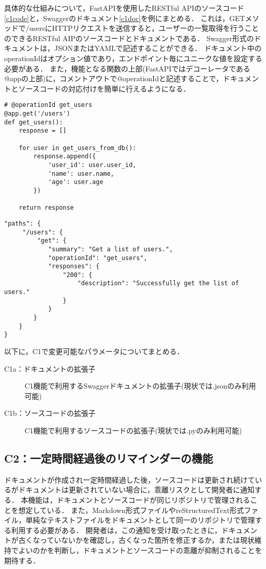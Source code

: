 具体的な仕組みについて，FastAPIを使用したRESTful APIのソースコード\ref{c1code}と，Swaggerのドキュメント\ref{c1doc}を例にまとめる．
これは，GETメソッドで/usersにHTTPリクエストを送信すると，ユーザーの一覧取得を行うことのできるRESTful AIPのソースコードとドキュメントである．
Swagger形式のドキュメントは，JSONまたはYAMLで記述することができる．
ドキュメント中のoperationIdはオプション値であり，エンドポイント毎にユニークな値を設定する必要がある．
また，機能となる関数の上部(FastAPIではデコーレータである@appの上部)に，コメントアウトで@operationIdと記述することで，ドキュメントとソースコードの対応付けを簡単に行えるようになる．

\begin{lstlisting}[caption=RESTful API, label=c1code]
# @operationId get_users
@app.get('/users')
def get_users():
    response = []

    for user in get_users_from_db():
        response.append({
            'user_id': user.user_id,
            'name': user.name,
            'age': user.age
        })

    return response
\end{lstlisting}


\begin{lstlisting}[caption=Swagger,label=c1doc]
"paths": {
     "/users": {
         "get": {
            "summary": "Get a list of users.",
            "operationId": "get_users",
            "responses": {
                "200": {
                    "description": "Successfully get the list of users."
                }
            }
        }
    }
}
\end{lstlisting}

以下に，C1で変更可能なパラメータについてまとめる．
\begin{description}
    \item[C1a：ドキュメントの拡張子] C1機能で利用するSwaggerドキュメントの拡張子(現状では.jsonのみ利用可能)
    \item[C1b：ソースコードの拡張子] C1機能で利用するソースコードの拡張子(現状では.pyのみ利用可能)
\end{description}


\subsection{C2：一定時間経過後のリマインダーの機能}
\label{c2}
ドキュメントが作成され一定時間経過した後，ソースコードは更新され続けているがドキュメントは更新されていない場合に，乖離リスクとして開発者に通知する．
本機能は，ドキュメントとソースコードが同じリポジトリで管理されることを想定している．
また，Markdown形式ファイルやreStructuredText形式ファイル，単純なテキストファイルをドキュメントとして同一のリポジトリで管理する利用する必要がある．
開発者は，この通知を受け取ったときに，ドキュメントが古くなっていないかを確認し，古くなった箇所を修正するか，または現状維持でよいのかを判断し，ドキュメントとソースコードの乖離が抑制されることを期待する．


